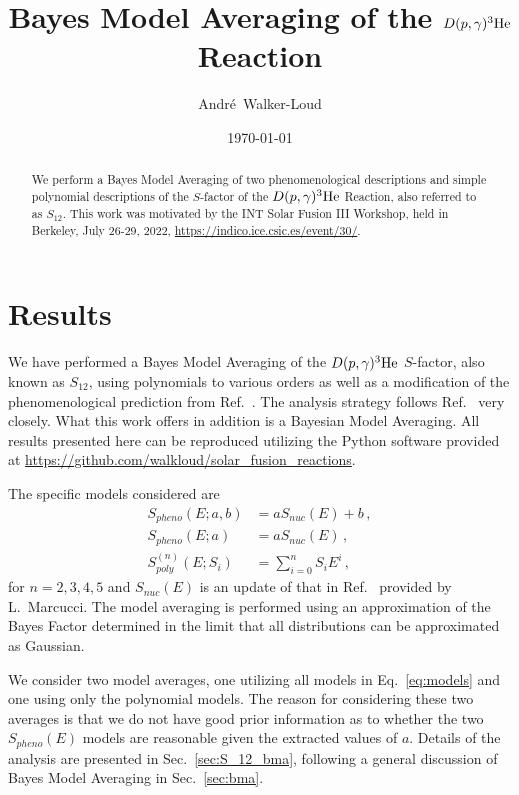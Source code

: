\documentclass[prd,10pt,superscriptaddress,notitlepage,tightenlines,nofootinbib,floatfix]{revtex4-1}
\begin{document}
\title{Bayes Model Averaging of the $D(p,{\gamma})^3{\rm He}$ Reaction}


\author{Andr\'{e}~Walker-Loud}

\date{\today}

\begin{abstract}
We perform a Bayes Model Averaging of two phenomenological descriptions and simple polynomial descriptions of the $S$-factor of the $D(p,{\gamma})^3{\rm He}$ Reaction, also referred to as $S_{12}$.
This work was motivated by the INT Solar Fusion III Workshop, held in Berkeley, July 26-29, 2022, \url{https://indico.ice.csic.es/event/30/}.
\end{abstract}
\maketitle
\tableofcontents

\section{Results}
We have performed a Bayes Model Averaging of the $D(p,{\gamma})^3{\rm He}$ $S$-factor, also known as $S_{12}$, using polynomials to various orders as well as a modification of the phenomenological prediction from Ref.~\cite{Marcucci:2005zc}.
The analysis strategy follows Ref.~\cite{Moscoso:2021xog} very closely.
What this work offers in addition is a Bayesian Model Averaging.
All results presented here can be reproduced utilizing the Python software provided at \url{https://github.com/walkloud/solar_fusion_reactions}.



The specific models considered are 
\begin{align}\label{eq:models}
S_{pheno}(E; a, b) &= a S_{nuc}(E) + b\, ,
\nonumber\\
S_{pheno}(E; a) &= a S_{nuc}(E)\, ,
\nonumber\\
S_{poly}^{(n)}(E; S_i) &= \sum_{i=0}^n S_i E^i\, ,
\end{align}
for $n=2,3,4,5$ and $S_{nuc}(E)$ is an update of that in Ref.~\cite{Marcucci:2005zc} provided by L.~Marcucci.
The model averaging is performed using an approximation of the Bayes Factor determined in the limit that all distributions can be approximated as Gaussian.

We consider two model averages, one utilizing all models in Eq.~\eqref{eq:models} and one using only the polynomial models.  The reason for considering these two averages is that we do not have good prior information as to whether the two $S_{pheno}(E)$ models are reasonable given the extracted values of $a$.
Details of the analysis are presented in Sec.~\ref{sec:S_12_bma}, following a general discussion of Bayes Model Averaging in Sec.~\ref{sec:bma}.
\end{document}
